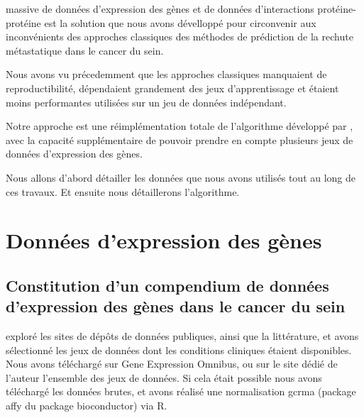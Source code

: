 			 massive de données d'expression des gènes et de données d'interactions protéine-protéine est la solution que nous avons dévelloppé pour circonvenir aux inconvénients des approches classiques des méthodes de prédiction de la rechute métastatique dans le cancer du sein.

			Nous avons vu précedemment que les approches classiques manquaient de reproductibilité, dépendaient grandement des jeux d'apprentissage et étaient moins performantes utilisées sur un jeu de données indépendant.

			Notre approche est une réimplémentation totale de l'algorithme développé par \citeauthor{Chuang2007}, avec la capacité supplémentaire de pouvoir prendre en compte plusieurs jeux de données d'expression des gènes.

			Nous allons d'abord détailler les données que nous avons utilisés tout au long de ces travaux.
			Et ensuite nous détaillerons l'algorithme.

	\section{\textcolor{green!60!black}{Données d'expression des gènes}}\label{sec:GEP}

		\subsection{\textcolor{green!60!black}{Constitution d'un compendium de données d'expression des gènes dans le cancer du sein}}
			 exploré les sites de dépôts de données publiques, ainsi que la littérature, et avons sélectionné les jeux de données dont les conditions cliniques étaient disponibles.
			Nous avons téléchargé sur Gene Expression Omnibus, ou sur le site dédié de l'auteur l'ensemble des jeux de données. Si cela était possible nous avons téléchargé les données brutes, et avons réalisé une normalisation gcrma (package affy du package bioconductor) via R.

